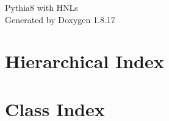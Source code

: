 \let\mypdfximage\pdfximage\def\pdfximage{\immediate\mypdfximage}\documentclass[twoside]{book}
\newcommand{\+}{\discretionary{\mbox{\scriptsize$\hookleftarrow$}}{}{}}
\newcommand{\clearemptydoublepage}{%
  \newpage{\pagestyle{empty}\cleardoublepage}%
}
\begin{document}
\hypersetup{pageanchor=false,
             bookmarksnumbered=true,
             pdfencoding=unicode
            }
\begin{titlepage}
\vspace*{7cm}
\begin{center}%
{\Large Pythia8 with H\+N\+Ls }\\
\vspace*{1cm}
{\large Generated by Doxygen 1.8.17}\\
\end{center}
\end{titlepage}
\clearemptydoublepage
{}
\tableofcontents
\clearemptydoublepage
{}
\hypersetup{pageanchor=true}

\chapter{Hierarchical Index}

\chapter{Class Index}

\end{document}
